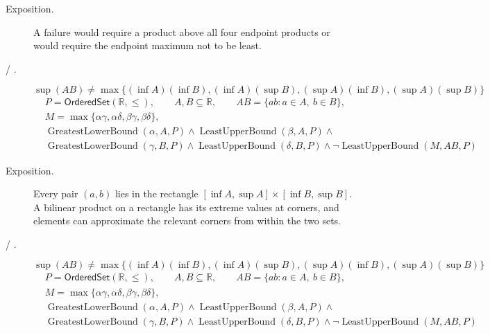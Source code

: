 \begin{remark*}
\begin{description}
  \item[Exposition.]
A failure would require a product above all four endpoint products or would
require the endpoint maximum not to be least.


  \item[ / .]
  \[
\sup(AB)\neq
\max\{(\inf A)(\inf B),(\inf A)(\sup B),(\sup A)(\inf B),(\sup A)(\sup B)\}
\]
\[
\begin{aligned}
&P=\mathsf{OrderedSet}(\mathbb{R},\leq),\qquad A,B\subseteq\mathbb{R},\qquad AB=\{ab:a\in A,\ b\in B\},\\
&M=\max\{\alpha\gamma,\alpha\delta,\beta\gamma,\beta\delta\},\\
&\operatorname{GreatestLowerBound}(\alpha,A,P)\land\operatorname{LeastUpperBound}(\beta,A,P)\land\\
&\operatorname{GreatestLowerBound}(\gamma,B,P)\land\operatorname{LeastUpperBound}(\delta,B,P)\land
\neg\operatorname{LeastUpperBound}(M,AB,P)
\end{aligned}
\]
\end{description}
\end{remark*}

\begin{remark*}
\begin{description}
  \item[Exposition.]
Every pair $(a,b)$ lies in the rectangle
$[\inf A,\sup A]\times[\inf B,\sup B]$.  A bilinear product on a rectangle has
its extreme values at corners, and elements can approximate the relevant
corners from within the two sets.


  \item[ / .]
  \[
\sup(AB)\neq
\max\{(\inf A)(\inf B),(\inf A)(\sup B),(\sup A)(\inf B),(\sup A)(\sup B)\}
\]
\[
\begin{aligned}
&P=\mathsf{OrderedSet}(\mathbb{R},\leq),\qquad A,B\subseteq\mathbb{R},\qquad AB=\{ab:a\in A,\ b\in B\},\\
&M=\max\{\alpha\gamma,\alpha\delta,\beta\gamma,\beta\delta\},\\
&\operatorname{GreatestLowerBound}(\alpha,A,P)\land\operatorname{LeastUpperBound}(\beta,A,P)\land\\
&\operatorname{GreatestLowerBound}(\gamma,B,P)\land\operatorname{LeastUpperBound}(\delta,B,P)\land
\neg\operatorname{LeastUpperBound}(M,AB,P)
\end{aligned}
\]
\end{description}
\end{remark*}

